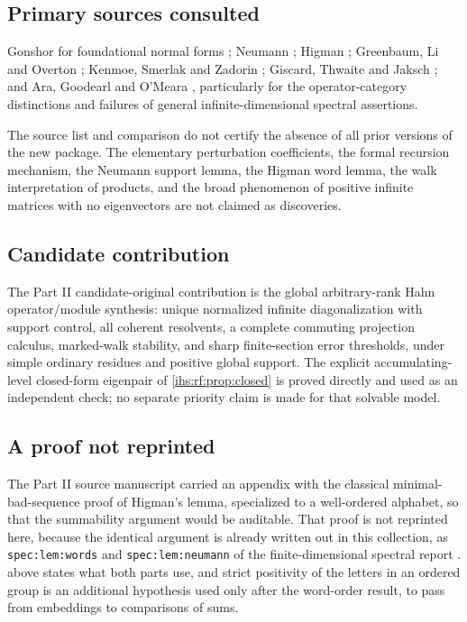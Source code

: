 \documentclass[11pt,a4paper]{article}
\numberwithin{equation}{section}
\theoremstyle{definition}
\theoremstyle{remark}
\begin{document}
\subsection{Primary sources consulted}\label{ihs:app:sourcesB}
Gonshor for foundational normal forms \cite{Gonshor}; Neumann
\cite{Neumann}; Higman \cite{Higman}; Greenbaum, Li and Overton \cite{glo};
Kenmoe, Smerlak and Zadorin \cite{ksz}; Giscard, Thwaite and Jaksch
\cite{pathsum}; and Ara, Goodearl and O'Meara \cite{ago}, particularly for
the operator-category distinctions and failures of general
infinite-dimensional spectral assertions.

The source list and comparison do not certify the absence of all prior
versions of the new package. The elementary perturbation coefficients, the
formal recursion mechanism, the Neumann support lemma, the Higman word
lemma, the walk interpretation of products, and the broad phenomenon of
positive infinite matrices with no eigenvectors are not claimed as
discoveries.

\subsection{Candidate contribution}\label{ihs:app:candidateB}
The Part II candidate-original contribution is the global arbitrary-rank
Hahn operator/module synthesis: unique normalized infinite diagonalization
with support control, all coherent resolvents, a complete commuting
projection calculus, marked-walk stability, and sharp finite-section error
thresholds, under simple ordinary residues and positive global support. The
explicit accumulating-level closed-form eigenpair of
\cref{ihs:rf:prop:closed} is proved directly and used as an independent
check; no separate priority claim is made for that solvable model.

\subsection{A proof not reprinted}\label{ihs:app:higmannote}
The Part II source manuscript carried an appendix with the classical
minimal-bad-sequence proof of Higman's lemma, specialized to a well-ordered
alphabet, so that the summability argument would be auditable. That proof is
not reprinted here, because the identical argument is already written out in
this collection, as \texttt{spec:lem:words} and \texttt{spec:lem:neumann} of
the finite-dimensional spectral report \cite{RepoSpectral}.
 above states what both parts use, and strict
positivity of the letters in an ordered group is an additional hypothesis
used only after the word-order result, to pass from embeddings to
comparisons of sums.
\end{document}
